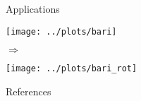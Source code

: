 \documentclass[xcolor=dvipsnames,aspectratio=169]{beamer}
\begin{document}
    \begin{frame}{Applications}
            \begin{minipage}{0.42\textwidth}
                \centering
                \texttt{[image: ../plots/bari]}
            \end{minipage}\hfill
            \begin{minipage}{0.05\textwidth}
                \centering
                $\Rightarrow$
            \end{minipage}\hfill
            \begin{minipage}{0.42\textwidth}
                \centering
                \texttt{[image: ../plots/bari\_rot]}
            \end{minipage}

    \end{frame}

     \appendix

    \begin{frame}{References}
        \nocite{gower_procrustes_2004}\nocite{bhatia_procrustes_2019}\nocite{Bhatia2007}
        \printbibliography
    \end{frame}
\end{document}
